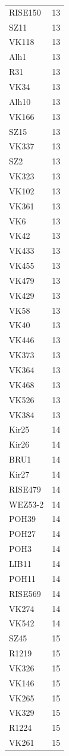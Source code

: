 \begin{longtable}[t]{ll}
RISE150 & 13\\
SZ11 & 13\\
VK118 & 13\\
Alh1 & 13\\
R31 & 13\\
VK34 & 13\\
Alh10 & 13\\
VK166 & 13\\
SZ15 & 13\\
VK337 & 13\\
SZ2 & 13\\
VK323 & 13\\
VK102 & 13\\
VK361 & 13\\
VK6 & 13\\
VK42 & 13\\
VK433 & 13\\
VK455 & 13\\
VK479 & 13\\
VK429 & 13\\
VK58 & 13\\
VK40 & 13\\
VK446 & 13\\
VK373 & 13\\
VK364 & 13\\
VK468 & 13\\
VK526 & 13\\
VK384 & 13\\
Kir25 & 14\\
Kir26 & 14\\
BRU1 & 14\\
Kir27 & 14\\
RISE479 & 14\\
WEZ53-2 & 14\\
POH39 & 14\\
POH27 & 14\\
POH3 & 14\\
LIB11 & 14\\
POH11 & 14\\
RISE569 & 14\\
VK274 & 14\\
VK542 & 14\\
SZ45 & 15\\
R1219 & 15\\
VK326 & 15\\
VK146 & 15\\
VK265 & 15\\
VK329 & 15\\
R1224 & 15\\
VK261 & 15\\

\end{longtable}
